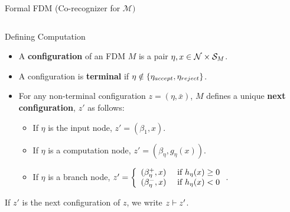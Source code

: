 \documentclass[c]{beamer}
\begin{document}
  

\begin{frame}{Formal FDM (Co-recognizer for $\mathcal{M})$}
  
  \begin{columns}
    \begin{center}
      \scaletopagewidth[.9]{\mandlegend{}}
    \end{center}
    
    \begin{center}
      \scaletopagewidth[.9]{\mandelrecfull{}}
    \end{center}
  \end{columns}

\end{frame}

\begin{frame}{Defining Computation}

  \begin{itemize}
    \setlength{\itemsep}{3mm}
  \item[] A \textbf{configuration} of an FDM $M$ is a pair $\eta, x \in
    \mathcal{N} \times \mathcal{S}_M$.\pause
  \item[] A configuration is \textbf{terminal} if $\eta \notin
    \{\eta_{accept}, \eta_{reject}\}$.\pause
  \item[] For any non-terminal configuration $z = (\eta, \bar{x})$, $M$
    defines a unique \textbf{next configuration}, $z'$ as follows:\\
    
    \begin{itemize}
    \item If $\eta$ is the input node, $z' = (\beta_{1}, x)$.
    \item If $\eta$ is a computation node, $z' = (\beta_{\eta}, g_\eta(x))$.
    \item If $\eta$ is a branch node, $z' = \left\{ \begin{array}{ll} (\beta_\eta^+,x) & \text{ if } h_\eta(x) \geq 0 \\ (\beta_\eta^-, x) & \text{ if } h_\eta(x) < 0 \end{array} \right.$.
    \end{itemize}
  \end{itemize}\pause

  \vspace{\baselineskip}

  If $z'$ is the next configuration of $z$, we write $z \vdash z'$.

\end{frame}
\end{document}
